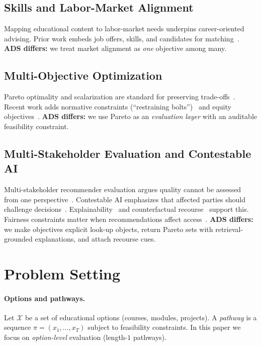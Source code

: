 \documentclass[sigconf,review]{acmart}
\begin{document}
\subsection{Skills and Labor-Market Alignment}
Mapping educational content to labor-market needs underpins career-oriented advising. Prior work embeds job offers, skills, and candidates for matching~\cite{giabelli2021skills2job,kara2022skillEmbeddings,leon2024transversalSkills}. \textbf{ADS differs:} we treat market alignment as \emph{one} objective among many.

\subsection{Multi-Objective Optimization}
Pareto optimality and scalarization are standard for preserving trade-offs~\cite{roijers2013survey_mosdm,deb2002nsga2}. Recent work adds normative constraints (``restraining bolts'')~\cite{monb2025,restrainingBolts2025} and equity objectives~\cite{equityMAMORL2025}. \textbf{ADS differs:} we use Pareto as an \emph{evaluation layer} with an auditable feasibility constraint.

\subsection{Multi-Stakeholder Evaluation and Contestable AI}
Multi-stakeholder recommender evaluation argues quality cannot be assessed from one perspective~\cite{abdollahpouri2020multistakeholder,burke2025mseval,ge2024trustworthyRS}.
Contestable AI emphasizes that affected parties should challenge decisions~\cite{aler2020contestable,alfrink2023contestable,dignum2025contesting}.
Explainability~\cite{zhang2020explainableRS} and counterfactual recourse~\cite{wachter2017counterfactual,ustun2019recourse,robustx2025} support this.
Fairness constraints matter when recommendations affect access~\cite{ekstrand2019fairness,dwork2012fairness,hardt2016equality,fairRankAgg2025,fairdas2024}.
\textbf{ADS differs:} we make objectives explicit look-up objects, return Pareto sets with retrieval-grounded explanations, and attach recourse cues.




\section{Problem Setting}
\label{sec:setting}

\paragraph{Options and pathways.}
Let $\mathcal{X}$ be a set of educational options (courses, modules, projects). A \emph{pathway} is a sequence $\pi=(x_1,\dots,x_T)$ subject to feasibility constraints. In this paper we focus on \emph{option-level} evaluation (length-$1$ pathways).
\end{document}

